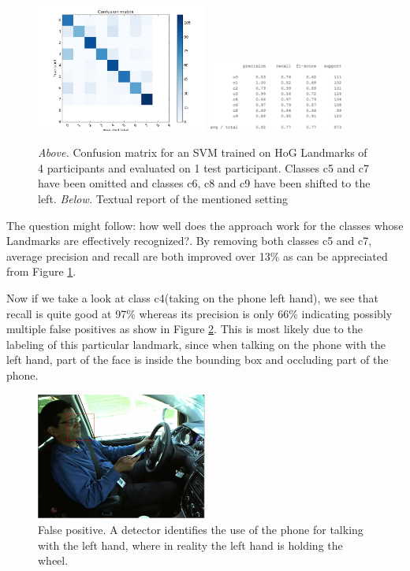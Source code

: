 \documentclass[10pt,twocolumn,letterpaper]{article}
\begin{document}
\begin{figure}[h]
	\centering
	\includegraphics[width=0.5\textwidth]{mult_HOG/4c01234689matComparable}
	\includegraphics[width=0.4\textwidth]{mult_HOG/4c01234689repComparable}
	\caption{\textit{Above.} Confusion matrix for an SVM trained on HoG Landmarks of 4 participants and evaluated on 1 test participant. Classes c5 and c7 have been omitted and classes c6, c8 and c9 have been shifted to the left. \textit{Below.} Textual report of the mentioned setting}
	\label{Landmarks_4no5no7}
\end{figure}

The question might follow: how well does the approach work for the classes whose Landmarks are effectively recognized?. By removing both classes c5 and c7, average precision and recall are both improved over 13\% as can be appreciated from Figure \ref{Landmarks_4no5no7}. 

Now if we take a look at class c4(taking on the phone left hand), we see that recall is quite good at 97\% whereas its precision is only 66\% indicating possibly multiple false positives as show in Figure \ref{Landmarks_false_detection}. This is most likely due to the labeling of this particular landmark, since when talking on the phone with the left hand, part of the face is inside the bounding box and occluding part of the phone.


\begin{figure}[h]
	\centering
	\includegraphics[width=0.5\textwidth]{mult_HOG/talk_phone_left}
	\caption{False positive. A detector identifies the use of the phone for talking with the left hand, where in reality the left hand is holding the wheel. }
	\label{Landmarks_false_detection}
\end{figure}
\end{document}

